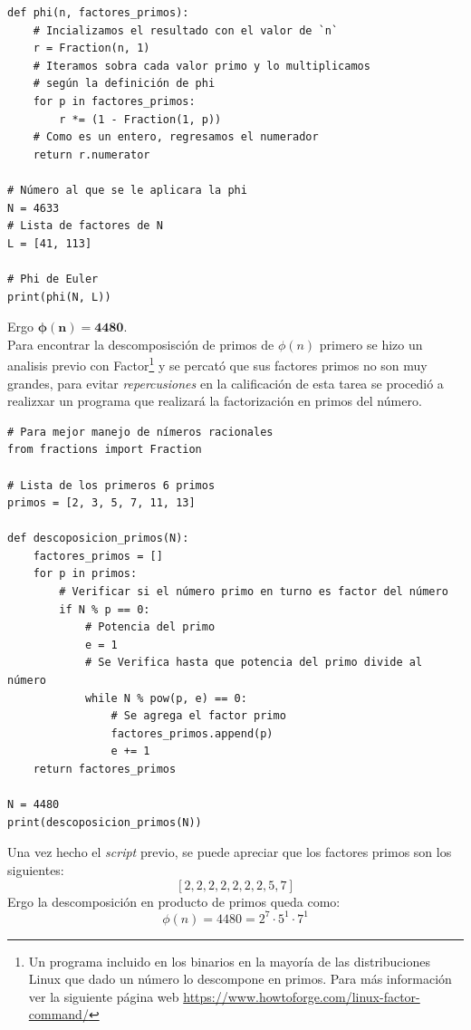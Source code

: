 \documentclass[11pt,letterpaper]{article}
\begin{document}
\begin{enumerate}[label=\alph*)]
\begin{verbatim}
def phi(n, factores_primos):
    # Incializamos el resultado con el valor de `n`
    r = Fraction(n, 1)
    # Iteramos sobra cada valor primo y lo multiplicamos 
    # según la definición de phi
    for p in factores_primos:
        r *= (1 - Fraction(1, p))
    # Como es un entero, regresamos el numerador
    return r.numerator

# Número al que se le aplicara la phi
N = 4633
# Lista de factores de N
L = [41, 113]

# Phi de Euler
print(phi(N, L))

\end{verbatim}
Ergo $\mathbf{\phi(n) = 4480}$.\\


Para encontrar la descomposisción de primos de $\phi(n)$ primero se hizo un analisis
previo con Factor\footnote{Un programa incluido en los binarios en la mayoría de las distribuciones Linux 
que dado un número lo descompone en primos. Para más información ver la siguiente 
página web \url{https://www.howtoforge.com/linux-factor-command/}} y se percató que sus factores primos no
son muy grandes, para evitar \textit{repercusiones} en la calificación de esta tarea se procedió a
realizxar un programa que realizará la factorización en primos del número.

\begin{verbatim}
# Para mejor manejo de nímeros racionales
from fractions import Fraction

# Lista de los primeros 6 primos
primos = [2, 3, 5, 7, 11, 13]

def descoposicion_primos(N):
    factores_primos = []
    for p in primos:
        # Verificar si el número primo en turno es factor del número
        if N % p == 0:
            # Potencia del primo
            e = 1
            # Se Verifica hasta que potencia del primo divide al número
            while N % pow(p, e) == 0:
                # Se agrega el factor primo
                factores_primos.append(p)
                e += 1
    return factores_primos
    
N = 4480
print(descoposicion_primos(N))

\end{verbatim}
Una vez hecho el \textit{script} previo, se puede apreciar que los factores primos son los siguientes:
$$[2, 2, 2, 2, 2, 2, 2, 5, 7]$$
Ergo la descomposición en producto de primos queda como:
$$\phi(n) = 4480 = 2^7 \cdot 5^1 \cdot 7^1$$



\end{enumerate}
\end{document}
